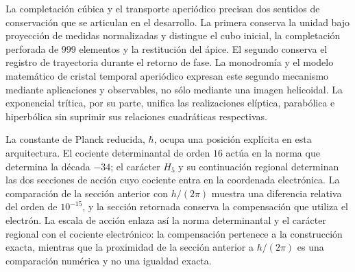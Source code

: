 La completación cúbica y el transporte aperiódico precisan dos sentidos
de conservación que se articulan en el desarrollo. La primera conserva
la unidad bajo proyección de medidas normalizadas y distingue el cubo
inicial, la completación perforada de \(999\) elementos y la restitución
del ápice. El segundo conserva el registro de trayectoria durante el
retorno de fase. La monodromía y el modelo matemático de cristal temporal
aperiódico expresan este segundo mecanismo mediante aplicaciones y
observables, no sólo mediante una imagen helicoidal. La exponencial
trítica, por su parte, unifica las realizaciones elíptica, parabólica e
hiperbólica sin suprimir sus relaciones cuadráticas respectivas.

La constante de Planck reducida, \(\hbar\), ocupa una posición explícita
en esta arquitectura. El cociente determinantal de orden \(16\) actúa
en la norma que determina la década \(-34\); el carácter \(H_5\) y su
continuación regional determinan las dos secciones de acción cuyo
cociente entra en la coordenada electrónica. La comparación de la
sección anterior con \(h/(2\pi)\) muestra una diferencia relativa del
orden de \(10^{-15}\), y la sección retornada conserva la compensación
que utiliza el electrón. La escala de acción enlaza así la norma
determinantal y el carácter regional con el cociente electrónico: la
compensación pertenece a la construcción exacta, mientras que la proximidad
de la sección anterior a \(h/(2\pi)\) es una comparación numérica y no
una igualdad exacta.
